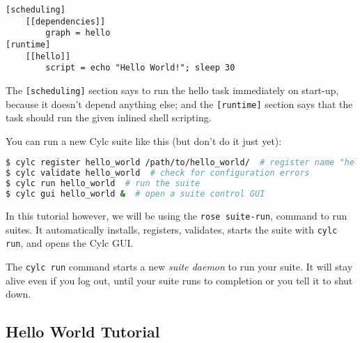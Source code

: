 \begin{lstlisting}[language=suiterc]
[scheduling]
    [[dependencies]]
        graph = hello
[runtime]
    [[hello]]
        script = echo "Hello World!"; sleep 30
\end{lstlisting}

The \lstinline{[scheduling]} section says to run the hello task immediately on
start-up, because it doesn't depend anything else; and the
\lstinline=[runtime]= section says that the task should run the given inlined
shell scripting.

You can run a new Cylc suite like this (but don't do it just yet):

\begin{lstlisting}[language=bash]
$ cylc register hello_world /path/to/hello_world/  # register name "hello_world"
$ cylc validate hello_world  # check for configuration errors
$ cylc run hello_world  # run the suite
$ cylc gui hello_world &  # open a suite control GUI
\end{lstlisting}

In this tutorial however, we will be using the \lstinline{rose suite-run},
command to run suites.  It automatically installs, registers, validates, starts
the suite with \lstinline=cylc run=, and opens the Cylc GUI.

The \lstinline{cylc run} command starts a new {\em suite daemon} to run your
suite.  It will stay alive even if you log out, until your suite runs to
completion or you tell it to shut down.


\subsection{Hello World Tutorial}

